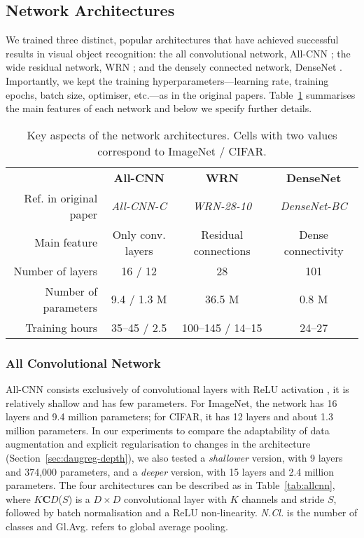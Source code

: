 {\subsection{Network Architectures}
\label{sec:daugreg-methods_archs}
We trained three distinct, popular architectures that have achieved successful results in visual object recognition: the all convolutional network, All-CNN \citep{springenberg2014allcnn}; the wide residual network, WRN \citep{zagoruyko2016wrn}; and the densely connected network, DenseNet \citep{huang2017densenet}. Importantly, we kept the training hyperparameters---learning rate, training epochs, batch size, optimiser, etc.---as in the original papers. Table~\ref{tab:architectures} summarises the main features of each network and below we specify further details.

\begin{table}[ht]
\begin{center}
\begin{tabular}{rccc}
    & \textbf{All-CNN} & \textbf{WRN} & \textbf{DenseNet}\\
    Ref. in original paper & \textit{All-CNN-C} & \textit{WRN-28-10} & \textit{DenseNet-BC}\\
    Main feature & Only conv. layers & Residual connections & Dense connectivity\\
    Number of layers & 16 / 12 & 28 & 101\\
    Number of parameters & 9.4 / 1.3 M & 36.5 M & 0.8 M\\
    Training hours & 35--45 / 2.5 & 100--145 / 14--15  & 24--27\\
\end{tabular}
\end{center}
\caption{Key aspects of the network architectures. Cells with two values correspond to ImageNet  / CIFAR.}
\label{tab:architectures}
\end{table}

\subsubsection{All Convolutional Network}
All-CNN consists exclusively of convolutional layers with ReLU activation \citep{glorot2011relu}, it is relatively shallow and has few parameters. For ImageNet, the network has 16 layers and 9.4 million parameters; for CIFAR, it has 12 layers and about 1.3 million parameters. In our experiments to compare the adaptability of data augmentation and explicit regularisation to changes in the architecture (Section~\ref{sec:daugreg-depth}), we also tested a \textit{shallower} version, with 9 layers and 374,000 parameters, and a \textit{deeper} version, with 15 layers and 2.4 million parameters. The four architectures can be described as in Table~\ref{tab:allcnn}, where $K$\textbf{C}$D$($S$) is a $D \times D$ convolutional layer with $K$ channels and stride $S$, followed by batch normalisation and a ReLU non-linearity. \textit{N.Cl.} is the number of classes and Gl.Avg. refers to global average pooling. 

}
